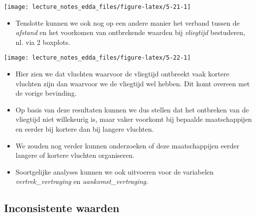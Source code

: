\documentclass[]{memoir}
\providecommand{\tightlist}{%
  \setlength{\itemsep}{0pt}\setlength{\parskip}{0pt}}
\begin{document}
\texttt{[image: lecture\_notes\_edda\_files/figure-latex/5-21-1]}

\begin{itemize}
\tightlist
\item
  Tenslotte kunnen we ook nog op een andere manier het verband tussen de \emph{afstand} en het voorkomen van ontbrekende waarden bij \emph{vliegtijd} bestuderen, nl. via 2 boxplots.
\end{itemize}

\texttt{[image: lecture\_notes\_edda\_files/figure-latex/5-22-1]}

\begin{itemize}
\tightlist
\item
  Hier zien we dat vluchten waarvoor de vliegtijd ontbreekt vaak kortere vluchten zijn dan waarvoor we de vliegtijd wel hebben. Dit komt overeen met de vorige bevinding.
\item
  Op basis van deze resultaten kunnen we dus stellen dat het ontbreken van de vliegtijd niet willekeurig is, maar vaker voorkomt bij bepaalde maatschappijen en eerder bij kortere dan bij langere vluchten.
\item
  We zouden nog verder kunnen onderzoeken of deze maatschappijen eerder langere of kortere vluchten organiseren.
\item
  Soortgelijke analyses kunnen we ook uitvoeren voor de variabelen \emph{vertrek\_vertraging} en \emph{aankomst\_vertraging}.
\end{itemize}

\hypertarget{inconsistente-waarden}{%
\subsection{Inconsistente waarden}\label{inconsistente-waarden}}
\end{document}
